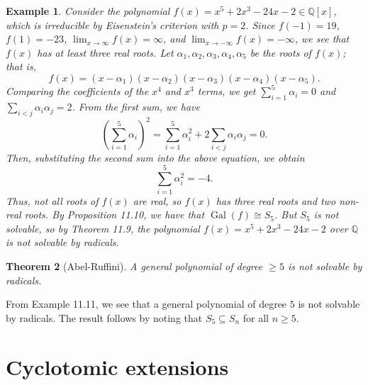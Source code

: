 \documentclass[10pt]{article}
\makeatletter
\newcommand{\Q}{\mathbb{Q}}
\DeclareMathOperator{\Gal}{Gal}
\theoremstyle{newstyle}
\newtheorem{thm}{Theorem}[section]
\newtheorem{exmp}[thm]{Example}
\newenvironment{pf}[1][\proofname]{\par
  \pushQED{\qed}%
  \normalfont \topsep0\p@\relax
  \trivlist
  \item[\hskip\labelsep\scshape
  #1\@addpunct{.}]\ignorespaces
}{%
  \popQED\endtrivlist\@endpefalse
}
\makeatother
\begin{document}
\begin{exmp}
Consider the polynomial $f(x) = x^5 + 2x^3 - 24x - 2 \in \Q[x]$, which is irreducible by 
Eisenstein's criterion with $p = 2$. Since $f(-1) = 19$, $f(1) = -23$, 
$\lim_{x\to\infty} f(x) = \infty$, and $\lim_{x\to-\infty} f(x) = -\infty$, we see that 
$f(x)$ has at least three real roots. Let $\alpha_1, \alpha_2, \alpha_3, \alpha_4, \alpha_5$
be the roots of $f(x)$; that is, 
\[ f(x) = (x-\alpha_1)(x-\alpha_2)(x-\alpha_3)(x-\alpha_4)(x-\alpha_5). \]
Comparing the coefficients of the $x^4$ and $x^3$ terms, we get 
$\sum_{i=1}^5 \alpha_i = 0$ and $\sum_{i<j} \alpha_i \alpha_j = 2$. From the first sum, we have
\[ \left( \sum_{i=1}^5 \alpha_i \right)^2 = \sum_{i=1}^5 \alpha_i^2 + 2 \sum_{i<j} \alpha_i\alpha_j = 0. \]
Then, substituting the second sum into the above equation, we obtain 
\[ \sum_{i=1}^5 \alpha_i^2 = -4. \]
Thus, not all roots of $f(x)$ are real, so $f(x)$ has three real roots and two non-real roots. 
By Proposition 11.10, we have that $\Gal(f) \cong S_5$. But $S_5$ is not solvable, so by 
Theorem 11.9, the polynomial $f(x) = x^5 + 2x^3 - 24x - 2$ over $\Q$ is not solvable by radicals. 
\end{exmp}

\begin{thm}[Abel-Ruffini]
A general polynomial of degree $\geq 5$ is not solvable by radicals.
\end{thm}
\begin{pf}
From Example 11.11, we see that a general polynomial of degree $5$ is not solvable by radicals. 
The result follows by noting that $S_5 \subseteq S_n$ for all $n \geq 5$. 
\end{pf}

\newpage 
\section{Cyclotomic extensions}
\end{document}
